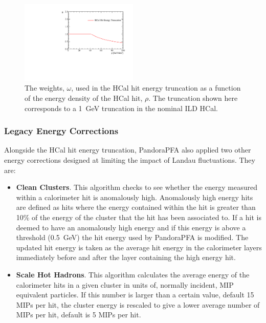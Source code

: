\begin{figure}[h!]
\includegraphics[width=0.5\textwidth]{EnergyEstimators/Plots/SoftComp/Weights/CellTruncWeights.pdf}
\caption[The weights, $\omega$, used in the HCal hit energy truncation as a function of the energy density of the HCal hit, $\rho$.  The truncation shown here corresponds to a 1~GeV truncation in the nominal ILD HCal.]{The weights, $\omega$, used in the HCal hit energy truncation as a function of the energy density of the HCal hit, $\rho$.  The truncation shown here corresponds to a 1~GeV truncation in the nominal ILD HCal.}
\label{fig:hcalcellweight}
\end{figure}


\subsubsection{Legacy Energy Corrections}
\label{sec:legacycorrections}
Alongside the HCal hit energy truncation, PandoraPFA also applied two other energy corrections designed at limiting the impact of Landau fluctuations.  They are:

\begin{itemize}
\item \textbf{Clean Clusters}.  This algorithm checks to see whether the energy measured within a calorimeter hit is anomalously high.  Anomalously high energy hits are defined as hits where the energy contained within the hit is greater than 10\% of the energy of the cluster that the hit has been associated to.  If a hit is deemed to have an anomalously high energy and if this energy is above a threshold (0.5~GeV) the hit energy used by PandoraPFA is modified.  The updated hit energy is taken as the average hit energy in the calorimeter layers immediately before and after the layer containing the high energy hit.    
\item \textbf{Scale Hot Hadrons}.  This algorithm calculates the average energy of the calorimeter hits in a given cluster in units of, normally incident, MIP equivalent particles.  If this number is larger than a certain value, default 15 MIPs per hit, the cluster energy is rescaled to give a lower average number of MIPs per hit, default is 5 MIPs per hit.  
\end{itemize}

